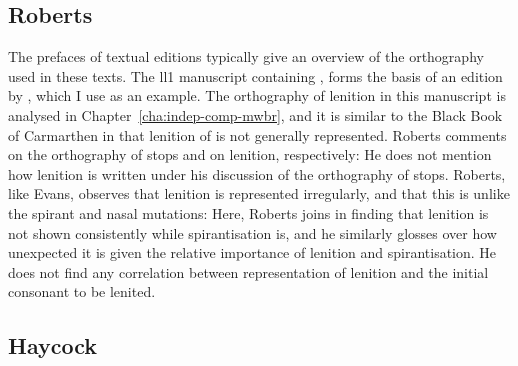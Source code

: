 \subsection{Roberts}
\label{sec:roberts}

The prefaces of textual editions typically give an overview of the orthography used in these texts. The \gls{ll1} manuscript containing , forms the basis of an edition
by \textcite{roberts_brut_1971}, which I use as an example. The orthography of lenition in this manuscript is analysed in Chapter~\ref{cha:indep-comp-mwbr}, and it is similar to the Black Book of Carmarthen in that lenition of  is not generally represented. Roberts comments on the
orthography of stops and on lenition, respectively:
He does not mention how lenition is written under his discussion of the orthography of stops. Roberts, like Evans, observes that lenition is represented irregularly, and that this is unlike the spirant and nasal mutations:
Here, Roberts joins \textcite{evans_grammar_1964} in finding that lenition is not shown consistently while spirantisation is, and he similarly glosses over how unexpected it is given the relative importance of lenition and spirantisation. He does not find any correlation between representation of lenition and the initial consonant to be lenited.

\subsection{Haycock}
\label{sec:haycock}

